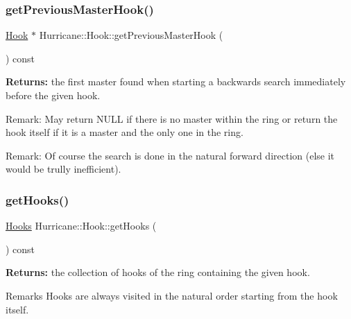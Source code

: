 \subsubsection{\texorpdfstring{get\+Previous\+Master\+Hook()}{getPreviousMasterHook()}}
{\footnotesize\ttfamily \mbox{\hyperlink{classHurricane_1_1Hook}{Hook}} $\ast$ Hurricane\+::\+Hook\+::get\+Previous\+Master\+Hook (\begin{DoxyParamCaption}{ }\end{DoxyParamCaption}) const}

{\bfseries Returns\+:} the first master found when starting a backwards search immediately before the given hook.

\begin{DoxyParagraph}{Remark\+: May return N\+U\+LL if there is no master within the ring or }
return the hook itself if it is a master and the only one in the ring.
\end{DoxyParagraph}
\begin{DoxyParagraph}{Remark\+: Of course the search is done in the natural forward direction }
(else it would be trully inefficient). 
\end{DoxyParagraph}
\mbox{\label{classHurricane_1_1Hook_a2def96fbcd444bebc16e589357c2a779}} 
\subsubsection{\texorpdfstring{get\+Hooks()}{getHooks()}}
{\footnotesize\ttfamily \mbox{\hyperlink{namespaceHurricane_a9dcd9b74dc5e2b51bec7a13c25807e02}{Hooks}} Hurricane\+::\+Hook\+::get\+Hooks (\begin{DoxyParamCaption}{ }\end{DoxyParamCaption}) const}

{\bfseries Returns\+:} the collection of hooks of the ring containing the given hook.

\begin{DoxyRemark}{Remarks}
Hooks are always visited in the natural order starting from the hook itself. 
\end{DoxyRemark}
\mbox{\label{classHurricane_1_1Hook_ad3c977e4f253a18cf24dfe4a6fd24cb1}} 
